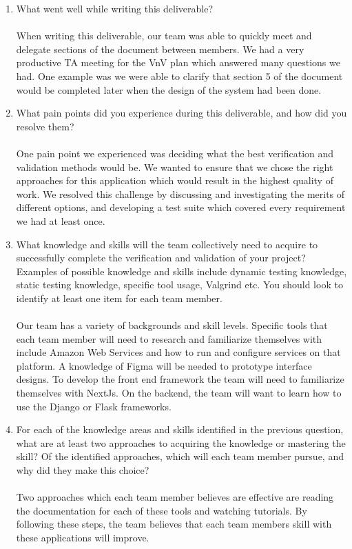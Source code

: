 \documentclass[12pt, titlepage]{article}
\begin{document}
\begin{enumerate}
  \item What went well while writing this deliverable?\\
    \\
    When writing this deliverable, our team was able to quickly meet
    and delegate
    sections of the document between members. We had a very productive TA
    meeting for the VnV plan which answered many questions we had. One example
    was we were able to clarify that section 5 of the document would be
    completed later when the design of the system had been done.

  \item What pain points did you experience during this deliverable, and how
    did you resolve them?\\
    \\
    One pain point we experienced was deciding what the best verification and
    validation methods would be. We wanted to ensure that we chose the right
    approaches for this application which would result in the highest quality
    of work. We resolved this challenge by discussing and investigating the
    merits of different options, and developing a test suite which covered
    every requirement we had at least once.

  \item What knowledge and skills will the team collectively need to acquire to
    successfully complete the verification and validation of your project?
    Examples of possible knowledge and skills include dynamic testing knowledge,
    static testing knowledge, specific tool usage, Valgrind etc.  You
    should look to
    identify at least one item for each team member.\\
    \\
    Our team has a variety of backgrounds and skill levels. Specific tools that
    each team member will need to research and familiarize themselves with
    include Amazon Web Services and how to run and configure services on that
    platform. A knowledge of Figma will be needed to prototype
    interface designs.
    To develop the front end framework the team will need to familiarize
    themselves with NextJs. On the backend, the team will want to learn how to
    use the Django or Flask frameworks.

  \item For each of the knowledge areas and skills identified in the previous
    question, what are at least two approaches to acquiring the knowledge or
    mastering the skill?  Of the identified approaches, which will each team
    member pursue, and why did they make this choice?\\
    \\
    Two approaches which each team member believes are effective are reading the
    documentation for each of these tools and watching tutorials. By following
    these steps, the team believes that each team members skill with these
    applications will improve.
\end{enumerate}
\end{document}
